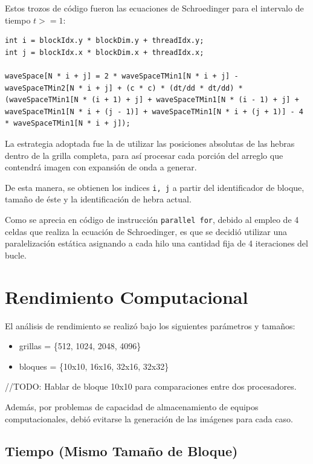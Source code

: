 \documentclass[jou]{apa6}
\begin{document}
Estos trozos de código fueron las ecuaciones de Schroedinger para el intervalo de tiempo $t >= 1$:

\lstset{language=C, breaklines=true, frame=single}

\begin{lstlisting}
int i = blockIdx.y * blockDim.y + threadIdx.y;
int j = blockIdx.x * blockDim.x + threadIdx.x;

waveSpace[N * i + j] = 2 * waveSpaceTMin1[N * i + j] - waveSpaceTMin2[N * i + j] + (c * c) * (dt/dd * dt/dd) * (waveSpaceTMin1[N * (i + 1) + j] + waveSpaceTMin1[N * (i - 1) + j] + waveSpaceTMin1[N * i + (j - 1)] + waveSpaceTMin1[N * i + (j + 1)] - 4 * waveSpaceTMin1[N * i + j]);
\end{lstlisting}

La estrategia adoptada fue la de utilizar las posiciones absolutas de las hebras dentro de la grilla completa, para así procesar cada porción del arreglo que contendrá imagen con expansión de onda a generar.

De esta manera, se obtienen los indices \texttt{i, j} a partir del identificador de bloque, tamaño de éste y la identificación de hebra actual.

Como se aprecia en código de instrucción \texttt{parallel for}, debido al empleo de 4 celdas que realiza la ecuación de Schroedinger, es que se decidió utilizar una paralelización estática asignando a cada hilo una cantidad fija de 4 iteraciones del bucle. 

\section{Rendimiento Computacional}

El análisis de rendimiento se realizó bajo los siguientes parámetros y tamaños:

\begin{itemize}
	\item grillas = \{512, 1024, 2048, 4096\}
	\item bloques = \{10x10, 16x16, 32x16, 32x32\}
\end{itemize}

//TODO: Hablar de bloque 10x10 para comparaciones entre dos procesadores.

Además, por problemas de capacidad de almacenamiento de equipos computacionales, debió evitarse la generación de las imágenes para cada caso.

\subsection{Tiempo (Mismo Tamaño de Bloque)}
\end{document}

